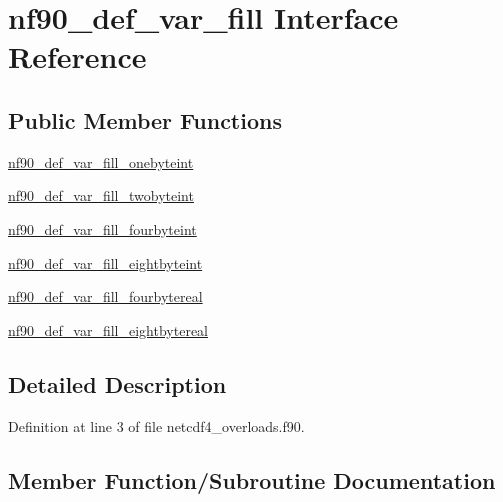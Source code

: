 \hypertarget{interfacenf90__def__var__fill}{}\section{nf90\+\_\+def\+\_\+var\+\_\+fill Interface Reference}
\label{interfacenf90__def__var__fill}
\subsection*{Public Member Functions}
\begin{DoxyCompactItemize}
\item 
\hyperlink{interfacenf90__def__var__fill_a6ab24ad88eb60030b9fa252ae4627703}{nf90\+\_\+def\+\_\+var\+\_\+fill\+\_\+onebyteint}
\item 
\hyperlink{interfacenf90__def__var__fill_a060b6c18122b5d2b7d22fbc7b72d170d}{nf90\+\_\+def\+\_\+var\+\_\+fill\+\_\+twobyteint}
\item 
\hyperlink{interfacenf90__def__var__fill_a248945daf5cb289dd57ea9e488034a12}{nf90\+\_\+def\+\_\+var\+\_\+fill\+\_\+fourbyteint}
\item 
\hyperlink{interfacenf90__def__var__fill_a075bcf465c3742896cd545f29165b60a}{nf90\+\_\+def\+\_\+var\+\_\+fill\+\_\+eightbyteint}
\item 
\hyperlink{interfacenf90__def__var__fill_a714f47050b0867f46a82e9cb13a915ac}{nf90\+\_\+def\+\_\+var\+\_\+fill\+\_\+fourbytereal}
\item 
\hyperlink{interfacenf90__def__var__fill_abc1200e5e0f19042ac4df1e2833ac76b}{nf90\+\_\+def\+\_\+var\+\_\+fill\+\_\+eightbytereal}
\end{DoxyCompactItemize}


\subsection{Detailed Description}


Definition at line 3 of file netcdf4\+\_\+overloads.\+f90.



\subsection{Member Function/\+Subroutine Documentation}
\mbox{\label{interfacenf90__def__var__fill_a075bcf465c3742896cd545f29165b60a}} 
